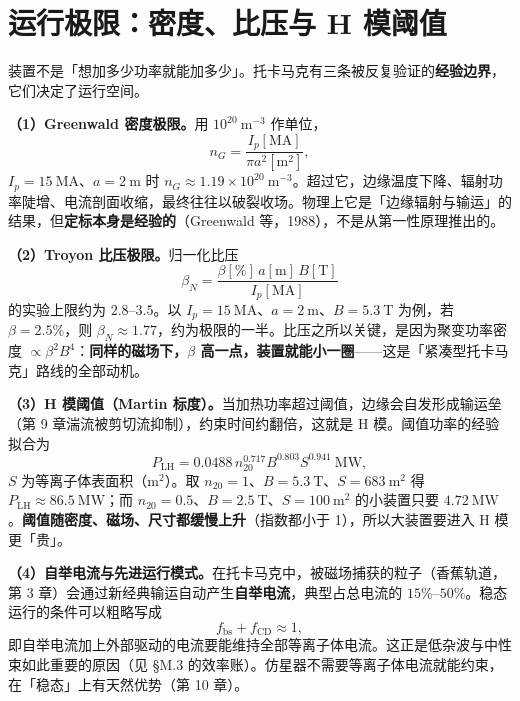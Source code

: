 \section{运行极限：密度、比压与 H 模阈值}

装置不是「想加多少功率就能加多少」。托卡马克有三条被反复验证的\textbf{经验边界}，它们决定了运行空间。

\textbf{（1）Greenwald 密度极限。}用 $10^{20}\ \mathrm{m^{-3}}$ 作单位，
\begin{equation}
n_G=\frac{I_p[\mathrm{MA}]}{\pi a^2[\mathrm{m^2}]},
\label{eq:app-m-greenwald}
\end{equation}
$I_p=15\ \mathrm{MA}$、$a=2\ \mathrm{m}$ 时 $n_G\approx1.19\times10^{20}\ \mathrm{m^{-3}}$。超过它，边缘温度下降、辐射功率陡增、电流剖面收缩，最终往往以破裂收场。物理上它是「边缘辐射与输运」的结果，但\textbf{定标本身是经验的}（Greenwald 等，1988），不是从第一性原理推出的。

\textbf{（2）Troyon 比压极限。}归一化比压
\begin{equation}
\beta_N=\frac{\beta[\%]\,a[\mathrm{m}]\,B[\mathrm{T}]}{I_p[\mathrm{MA}]}
\end{equation}
的实验上限约为 $2.8$--$3.5$。以 $I_p=15\ \mathrm{MA}$、$a=2\ \mathrm{m}$、$B=5.3\ \mathrm{T}$ 为例，若 $\beta=2.5\%$，则 $\beta_N\approx1.77$，约为极限的一半。比压之所以关键，是因为聚变功率密度 $\propto\beta^2B^4$：\textbf{同样的磁场下，$\beta$ 高一点，装置就能小一圈}——这是「紧凑型托卡马克」路线的全部动机。

\textbf{（3）H 模阈值（Martin 标度）。}当加热功率超过阈值，边缘会自发形成输运垒（第 9 章湍流被剪切流抑制），约束时间约翻倍，这就是 H 模。阈值功率的经验拟合为
\begin{equation}
P_{\mathrm{LH}}=0.0488\,n_{20}^{0.717}B^{0.803}S^{0.941}\ \mathrm{MW},
\label{eq:app-m-martin}
\end{equation}
$S$ 为等离子体表面积（$\mathrm{m^2}$）。取 $n_{20}=1$、$B=5.3\ \mathrm{T}$、$S=683\ \mathrm{m^2}$ 得 $P_{\mathrm{LH}}\approx86.5\ \mathrm{MW}$；而 $n_{20}=0.5$、$B=2.5\ \mathrm{T}$、$S=100\ \mathrm{m^2}$ 的小装置只要 $4.72\ \mathrm{MW}$。\textbf{阈值随密度、磁场、尺寸都缓慢上升}（指数都小于 1），所以大装置要进入 H 模更「贵」。

\textbf{（4）自举电流与先进运行模式。}在托卡马克中，被磁场捕获的粒子（香蕉轨道，第 3 章）会通过新经典输运自动产生\textbf{自举电流}，典型占总电流的 $15\%$--$50\%$。稳态运行的条件可以粗略写成
\[
f_{\mathrm{bs}}+f_{\mathrm{CD}}\approx1,
\]
即自举电流加上外部驱动的电流要能维持全部等离子体电流。这正是低杂波与中性束如此重要的原因（见 \S M.3 的效率账）。仿星器不需要等离子体电流就能约束，在「稳态」上有天然优势（第 10 章）。

